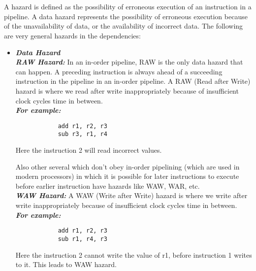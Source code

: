 \documentclass[12pt]{article}
\begin{document}
\maketitle


\section{}
A hazard is defined as the possibility of erroneous execution of an instruction in a pipeline. A data hazard represents the possibility of erroneous execution because of the unavailability of data, or the availability of incorrect data.
The following are very general hazards in the dependencies:
\begin{itemize}
    \item \textbf{\textit{Data Hazard}}\\
        \textbf{\textit{RAW Hazard:}} In an in-order
        pipeline, RAW is the only data hazard that can happen.  A preceding instruction is always ahead of a succeeding instruction in the pipeline in an in-order pipeline. A RAW (Read after Write) hazard is where we read after write inappropriately because of insufficient clock cycles time in between. \\
        \textbf{\textit{For example:}}
        \begin{verbatim}
            add r1, r2, r3
            sub r3, r1, r4
        \end{verbatim}
        Here the instruction 2 will read incorrect values.
        
        Also other several which don't obey in-order pipelining (which are used in modern processors) in which it is possible for later instructions to execute before earlier instruction have hazards like WAW, WAR, etc. \\
        
        \textbf{\textit{WAW Hazard:}} A WAW (Write after Write) hazard is where we write after write inappropriately because of insufficient clock cycles time in between. \\
        \textbf{\textit{For example:}}
        \begin{verbatim}
            add r1, r2, r3
            sub r1, r4, r3
        \end{verbatim}
        Here the instruction 2 cannot write the value of r1, before instruction 1 writes to it. This leads to WAW hazard. \\
        

\end{itemize}
\end{document}
